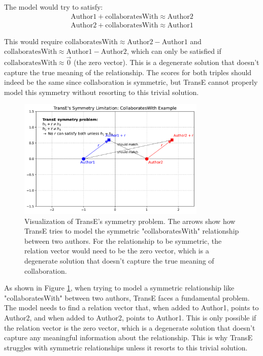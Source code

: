 \documentclass[10pt,a4paper]{article}
\begin{document}
The model would try to satisfy:
\begin{align*}
    \text{Author1} + \text{collaboratesWith} \approx \text{Author2} \\
    \text{Author2} + \text{collaboratesWith} \approx \text{Author1}
\end{align*}

This would require $\text{collaboratesWith} \approx \text{Author2} - \text{Author1}$ and $\text{collaboratesWith} \approx \text{Author1} - \text{Author2}$, which can only be satisfied if $\text{collaboratesWith} \approx \vec{0}$ (the zero vector). This is a degenerate solution that doesn't capture the true meaning of the relationship. The scores for both triples should indeed be the same since collaboration is symmetric, but TransE cannot properly model this symmetry without resorting to this trivial solution.

\begin{figure}[H]
    \centering
    \includegraphics[width=0.8\textwidth]{img/transe_symmetry.pdf}
    \caption{Visualization of TransE's symmetry problem. The arrows show how TransE tries to model the symmetric "collaboratesWith" relationship between two authors. For the relationship to be symmetric, the relation vector would need to be the zero vector, which is a degenerate solution that doesn't capture the true meaning of collaboration.}
    \label{fig:transe_symmetry}
\end{figure}

As shown in Figure \ref{fig:transe_symmetry}, when trying to model a symmetric relationship like "collaboratesWith" between two authors, TransE faces a fundamental problem. The model needs to find a relation vector that, when added to Author1, points to Author2, and when added to Author2, points to Author1. This is only possible if the relation vector is the zero vector, which is a degenerate solution that doesn't capture any meaningful information about the relationship. This is why TransE struggles with symmetric relationships unless it resorts to this trivial solution.
\end{document}

